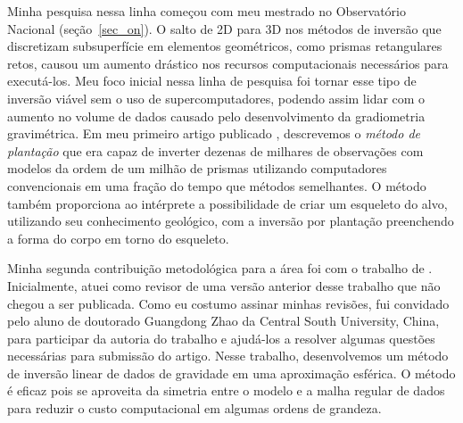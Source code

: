\documentclass[10pt,a4paper,oneside]{book}
\begin{document}
Minha pesquisa nessa linha começou com meu mestrado no Observatório Nacional
(seção~\ref{sec_on}).
O salto de 2D para 3D nos métodos de inversão que discretizam subsuperfície em
elementos geométricos, como prismas retangulares retos, causou um aumento
drástico nos recursos computacionais necessários para executá-los.
Meu foco inicial nessa linha de pesquisa foi tornar esse tipo de inversão
viável sem o uso de supercomputadores, podendo assim lidar com o aumento no
volume de dados causado pelo desenvolvimento da gradiometria gravimétrica.
Em meu primeiro artigo publicado \citep{Uieda2012}, descrevemos o
\textit{método de plantação} que era capaz de inverter dezenas de milhares de
observações com modelos da ordem de um milhão de prismas utilizando
computadores convencionais em uma fração do tempo que métodos semelhantes.
O método também proporciona ao intérprete a possibilidade de criar um esqueleto
do alvo, utilizando seu conhecimento geológico, com a inversão por plantação
preenchendo a forma do corpo em torno do esqueleto.

Minha segunda contribuição metodológica para a área foi com o trabalho de
\citet{Zhao2019}.
Inicialmente, atuei como revisor de uma versão anterior desse trabalho que não
chegou a ser publicada.
Como eu costumo assinar minhas revisões, fui convidado pelo aluno de doutorado
Guangdong Zhao da Central South University, China, para participar da autoria
do trabalho e ajudá-los a resolver algumas questões necessárias para submissão
do artigo.
Nesse trabalho, desenvolvemos um método de inversão linear de dados de
gravidade em uma aproximação esférica.
O método é eficaz pois se aproveita da simetria entre o modelo e a malha regular
de dados para reduzir o custo computacional em algumas ordens de grandeza.
\end{document}
